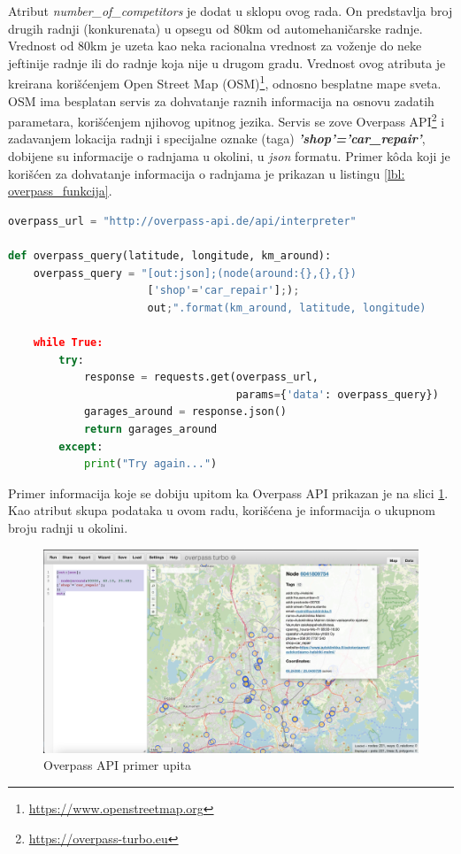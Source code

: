 \documentclass[12pt,oneside]{memoir}
\begin{document}
Atribut \textit{number\_of\_competitors} je dodat u sklopu ovog rada. On predstavlja broj drugih radnji (konkurenata) u opsegu od 80km od automehaničarske radnje. Vrednost od 80km je uzeta kao neka racionalna vrednost za voženje do neke jeftinije radnje ili do radnje koja nije u drugom gradu. Vrednost ovog atributa je kreirana korišćenjem Open Street Map (OSM)\footnote{\url{https://www.openstreetmap.org}}, odnosno besplatne mape sveta. OSM ima besplatan servis za dohvatanje raznih informacija na osnovu zadatih parametara, korišćenjem njihovog upitnog jezika. Servis se zove Overpass API\footnote{\url{https://overpass-turbo.eu}} i zadavanjem lokacija radnji i specijalne oznake (taga) \textbf{\textit{'shop'='car\_repair'}}, dobijene su informacije o radnjama u okolini, u \textit{json} formatu. Primer kôda koji je korišćen za dohvatanje informacija o radnjama je prikazan u listingu \ref{lbl: overpass_funkcija}.
\begin{table}
\begin{lstlisting}[language=python, belowskip=-\baselineskip, frame=single, label=lbl: overpass_funkcija, caption={Funkcija za dohvatanje informacija o drugim radnjama u okolini}]
overpass_url = "http://overpass-api.de/api/interpreter"

def overpass_query(latitude, longitude, km_around):
    overpass_query = "[out:json];(node(around:{},{},{})
                      ['shop'='car_repair'];);
                      out;".format(km_around, latitude, longitude)

    while True:
        try:
            response = requests.get(overpass_url, 
                                    params={'data': overpass_query})
            garages_around = response.json()
            return garages_around
        except:
            print("Try again...")
\end{lstlisting} 
\end{table}
Primer informacija koje se dobiju upitom ka Overpass API prikazan je na slici \ref{fig: overpass}. Kao atribut skupa podataka u ovom radu, korišćena je informacija o ukupnom broju radnji u okolini. 
\vspace{40pt}
\begin{figure}[!ht]
  \centering
  \includegraphics[width=1\textwidth]{./grafici/overpass_primer.png}
  \caption{Overpass API primer upita}
  \label{fig: overpass}
\end{figure}
\vspace{-50pt}
\end{document}
